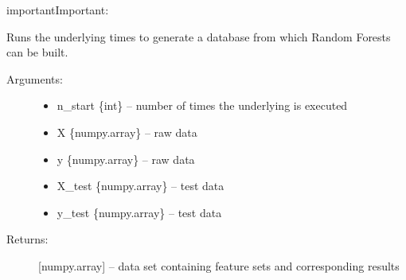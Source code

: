 \documentclass[letterpaper,10pt,english]{sphinxmanual}
\begin{document}
\begin{sphinxadmonition}{important}{Important:}
\begin{fulllineitems}
\begin{description}
\end{description}

\end{fulllineitems}


\begin{fulllineitems}
\label{\detokenize{Generate_Database:ForestFire.Main.gen_database}}
Runs the underlying {\hyperref[\detokenize{Overview:mla}]{}}  times to generate a database from which Random Forests can be built.
\begin{description}
\item[{Arguments:}] \leavevmode\begin{itemize}
\item {} 
n\_start \{int\} -- number of times the underlying {\hyperref[\detokenize{Overview:mla}]{}} is executed

\item {} 
X \{numpy.array\} -- raw data

\item {} 
y \{numpy.array\} -- raw data

\item {} 
X\_test \{numpy.array\} -- test data

\item {} 
y\_test \{numpy.array\} -- test data

\end{itemize}

\item[{Returns:}] \leavevmode
{[}numpy.array{]} -- data set containing feature sets and corresponding results

\end{description}

\end{fulllineitems}

\end{sphinxadmonition}
\label{\detokenize{Generate_Database:blank}}\begin{figure}[htbp]
\centering

\noindent{}
\label{\detokenize{Generate_Database:blank}}\end{figure}
\end{document}
